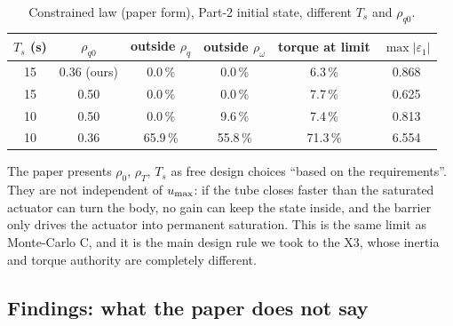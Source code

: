 \begin{table}[H]
\centering\small
\caption{Constrained law (paper form), Part-2 initial state, different $T_s$ and $\rho_{q0}$.}
\label{tab:sens}
\begin{tabular}{@{}cccccc@{}}
\toprule
$T_s$ (s) & $\rho_{q0}$ & outside $\rho_q$ & outside $\rho_\omega$ & torque at limit & $\max|\varepsilon_1|$\\
\midrule
15 & 0.36 (ours) & 0.0\,\% & 0.0\,\% & 6.3\,\% & 0.868\\
15 & 0.50 & 0.0\,\% & 0.0\,\% & 7.7\,\% & 0.625\\
10 & 0.50 & 0.0\,\% & 9.6\,\% & 7.4\,\% & 0.813\\
10 & 0.36 & 65.9\,\% & 55.8\,\% & 71.3\,\% & 6.554\\
\bottomrule
\end{tabular}
\end{table}


\begin{warn}
The paper presents $\rho_0$, $\rho_T$, $T_s$ as free design choices ``based on the requirements''. They are not
independent of $u_{\max}$: if the tube closes faster than the saturated actuator can turn the body, no gain can keep the state
inside, and the barrier only drives the actuator into permanent saturation. This is the same limit as Monte-Carlo C, and it
is the main design rule we took to the X3, whose inertia and torque authority are completely different.
\end{warn}

\subsection{Findings: what the paper does not say}
\label{sec:findings}

